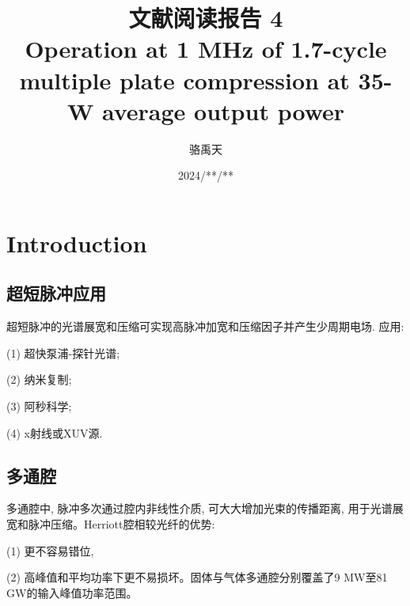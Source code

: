 \documentclass[14pt,a4paper,oneside]{article}
\title{\textbf{文献阅读报告 4\\Operation at 1 MHz of 1.7-cycle multiple plate compression at 35-W average output power}}                           %
\author{骆禹天}                                           %
\date{2024/**/**}                                        %
\numberwithin{equation}{subsection}             %
\numberwithin{figure}{subsection}               %
\begin{document}

\maketitle

\setcounter{page}{1}          %


\tableofcontents              %

\newpage                      
\setcounter{page}{1}          %








\section{Introduction}

\subsection{超短脉冲应用}

超短脉冲的光谱展宽和压缩可实现高脉冲加宽和压缩因子并产生少周期电场. 应用: 

(1) 超快泵浦-探针光谱\cite{pashkinElectricMagneticTerahertz2013};

(2) 纳米复制;\cite{planklSubcycleContactfreeNanoscopy2021}

(3) 阿秒科学;\cite{corkumAttosecondScience2007}

(4) x射线或XUV源\cite{klasUltrashortpulseHighaveragepowerMegahertzrepetitionrate2021, teichmann5keVSoftXray2016}.

\subsection{多通腔}

多通腔中, 脉冲多次通过腔内非线性介质, 可大大增加光束的传播距离, 用于光谱展宽和脉冲压缩。Herriott腔相较光纤的优势:

(1) 更不容易错位, 

(2) 高峰值和平均功率下更不易损坏。固体与气体多通腔分别覆盖了9 MW\cite{weitenbergMultipasscellbasedNonlinearPulse2017a}至81 GW\cite{kaumannsSpectralBroadening1122021}的输入峰值功率范围。
\end{document}
